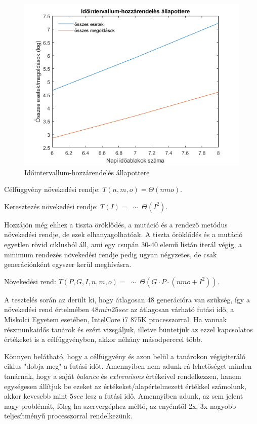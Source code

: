 \begin{figure}
	\includegraphics[width=\linewidth]{images/idointervallum.png}
	\caption{Időintervallum-hozzárendelés állapottere}
\end{figure}

Célfüggvény növekedési rendje: $T(n,m,o)=\Theta(nmo)$.

Keresztezés növekedési rendje: $T(I)=\ \sim \ \Theta(I^2)$.

Hozzájön még ehhez a tiszta öröklődés, a mutáció és a rendező metódus növekedési rendje, de ezek elhanyagolhatóak. A tiszta öröklődés és a mutáció egyetlen rövid ciklusból áll, ami egy csupán 30-40 elemű listán iterál végig, a minimum rendezés növekedési rendje pedig ugyan négyzetes, de csak generációnként egyszer kerül meghívásra.

Növekedési rend: $T(P,G,I,n,m,o)=\ \sim \ \Theta(G \cdot P \cdot (nmo+I^2))$.

A tesztelés során az derült ki, hogy átlagosan 48 generációra van szükség, így a növekedési rend értelmében $48min 25sec$ az átlagosan várható futási idő, a Miskolci Egyetem esetében, IntelCore i7 875K processzorral. Ha vannak részmunkaidős tanárok és ezért vizsgáljuk, illetve büntetjük az ezzel kapcsolatos értékeket is a célfüggvényben, akkor néhány másodperccel több.

Könnyen belátható, hogy a célfüggvény és azon belül a tanárokon végigiteráló ciklus "dobja meg" a futási időt. Amennyiben nem adunk rá lehetőséget minden tanárnak, hogy a saját \textit{balance} és \textit{extremisms} értékeivel rendelkezzen, hanem egységesen állítjuk be ezeket az értékeket/alapértelmezett értékkel számolunk, akkor kevesebb mint $5 sec$ lesz a futási idő. Amennyiben adunk, az sem jelent nagy problémát, főleg ha szervergéphez méltó, az enyémtől 2x, 3x nagyobb teljesítményű processzorral rendelkezünk.

